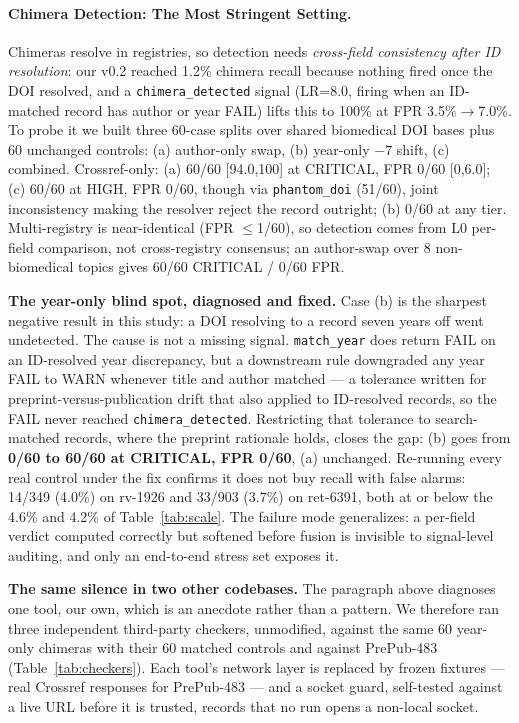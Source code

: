 \documentclass[letterpaper]{article} %
\begin{document}
\paragraph{Chimera Detection: The Most Stringent Setting.} Chimeras resolve in registries, so detection needs \emph{cross-field consistency after ID resolution}: our v0.2 reached 1.2\% chimera recall because nothing fired once the DOI resolved, and a \texttt{chimera\_\allowbreak detected} signal (LR=8.0, firing when an ID-matched record has author or year FAIL) lifts this to 100\% at FPR 3.5\%$\to$7.0\%. To probe it we built three 60-case splits over shared biomedical DOI bases plus 60 unchanged controls: (a) author-only swap, (b) year-only $-7$ shift, (c) combined. Crossref-only: (a) 60/60 [94.0,100] at CRITICAL, FPR 0/60 [0,6.0]; (c) 60/60 at HIGH, FPR 0/60, though via \texttt{phantom\_doi} (51/60), joint inconsistency making the resolver reject the record outright; (b) 0/60 at any tier. Multi-registry is near-identical (FPR $\leq$1/60), so detection comes from L0 per-field comparison, not cross-registry consensus; an author-swap over 8 non-biomedical topics gives 60/60 CRITICAL / 0/60 FPR.

\noindent\textbf{The year-only blind spot, diagnosed and fixed.} Case (b) is the sharpest negative result in this study: a DOI resolving to a record seven years off went undetected. The cause is not a missing signal. \texttt{match\_year} does return FAIL on an ID-resolved year discrepancy, but a downstream rule downgraded any year FAIL to WARN whenever title and author matched --- a tolerance written for preprint-versus-publication drift that also applied to ID-resolved records, so the FAIL never reached \texttt{chimera\_detected}. Restricting that tolerance to search-matched records, where the preprint rationale holds, closes the gap: (b) goes from \textbf{0/60 to 60/60 at CRITICAL, FPR 0/60}, (a) unchanged. Re-running every real control under the fix confirms it does not buy recall with false alarms: 14/349 (4.0\%) on rv-1926 and 33/903 (3.7\%) on ret-6391, both at or below the 4.6\% and 4.2\% of Table~\ref{tab:scale}. The failure mode generalizes: a per-field verdict computed correctly but softened before fusion is invisible to signal-level auditing, and only an end-to-end stress set exposes it.

\noindent\textbf{The same silence in two other codebases.} The paragraph above
diagnoses one tool, our own, which is an anecdote rather than a pattern. We
therefore ran three independent third-party checkers, unmodified, against the
same 60 year-only chimeras with their 60 matched controls and against
PrePub-483 (Table~\ref{tab:checkers}). Each tool's network layer is replaced by
frozen fixtures --- real Crossref responses for PrePub-483 --- and a socket
guard, self-tested against a live URL before it is trusted, records that no run
opens a non-local socket.
\end{document}
